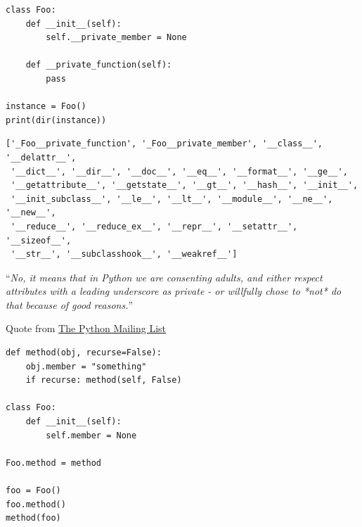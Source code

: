 \begin{frame}[fragile]
%
\begin{codebox}
\begin{verbatim}
class Foo:
    def __init__(self):
        self.__private_member = None

    def __private_function(self):
        pass

instance = Foo()
print(dir(instance))
\end{verbatim}
\end{codebox}
%
\begin{cmdbox}[Output]
\begin{verbatim}
['_Foo__private_function', '_Foo__private_member', '__class__', '__delattr__',
 '__dict__', '__dir__', '__doc__', '__eq__', '__format__', '__ge__',
 '__getattribute__', '__getstate__', '__gt__', '__hash__', '__init__',
 '__init_subclass__', '__le__', '__lt__', '__module__', '__ne__', '__new__',
 '__reduce__', '__reduce_ex__', '__repr__', '__setattr__', '__sizeof__',
 '__str__', '__subclasshook__', '__weakref__']
\end{verbatim}
\end{cmdbox}
%
\end{frame}


\begin{frame}[fragile]
%
\vspace*{-7pt}
\begin{defbox}
\footnotesize
\enquote{\emph{{\color{gray}No, it means that} in Python we are consenting adults, and either respect
attributes with a leading underscore as private - or willfully chose to
*not* do that because of good reasons.}}

\vspace{3pt}
Quote from \href{https://mail.python.org/pipermail/python-list/2009-November.txt}{\thus The Python Mailing List}
\end{defbox}
%
\vspace*{-10pt}
\begin{codebox}
\begin{verbatim}
def method(obj, recurse=False):
    obj.member = "something"
    if recurse: method(self, False)
    
class Foo:
    def __init__(self):
        self.member = None

Foo.method = method

foo = Foo()
foo.method()
method(foo)
\end{verbatim}
\end{codebox}
%
\end{frame}

